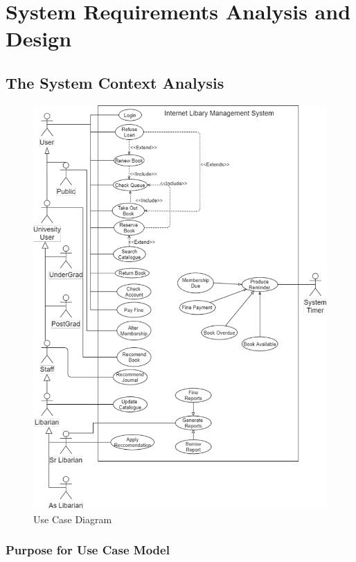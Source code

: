 \chapter{System Requirements Analysis and Design}
\section{The System Context Analysis}

\begin{figure}[H]
    \centering
    \includegraphics[width=0.8\linewidth]{image/use_cases.png}
    \caption{Use Case Diagram}
    \label{fig:usecase}
\end{figure}

\subsection{Purpose for Use Case Model}

